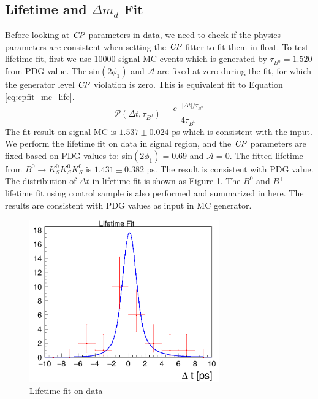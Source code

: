 \subsection{Lifetime and $\Delta m_d$ Fit}
Before looking at $\it{CP}$ parameters in data, we need to check if the physics parameters are consistent when setting the $\it{CP}$ fitter to fit them in float. To test lifetime fit, first we use 10000 signal MC events which is generated by $\tau_{B^0} = 1.520$ from PDG value. The sin$(2\phi_1)$ and $\mathcal{A}$ are fixed at zero during the fit, for which the generator level $\it{CP}$ violation is zero. This is equivalent fit to Equation \ref{eq:cpfit_mc_life}.
\begin{equation}\label{eq:cpfit_mc_life}
\mathcal{P}(\Delta t,\tau_{B^0}) = 
\frac{e^{-|\Delta t|/\tau_{B^0}}}{4\tau_{B^0}}
\end{equation}
The fit result on signal MC is $1.537 \pm 0.024$ ps which is consistent with the input. We perform the lifetime fit on data in signal region, and the $\it{CP}$ parameters are fixed based on PDG values to: sin$(2\phi_1)=0.69$ and $\mathcal{A} = 0$. The fitted lifetime from $B^0 \to K_S^0  K_S^0  K_S^0$ is $1.431\pm 0.382$ ps. The result is consistent with PDG value. The distribution of $\Delta t$ in lifetime fit is shown as Figure \ref{fig:cpfit_data_life}.
The $B^0$ and $B^+$ lifetime fit using control sample is also performed and summarized in here\cite{jpsiks_ichep}. The results are consistent with PDG values as input in MC generator. 
\begin{figure}[H]
	\centering
	\includegraphics[height=7cm]{figures/lifetime_data}
	\caption{Lifetime fit on data}
	\label{fig:cpfit_data_life}
\end{figure}

